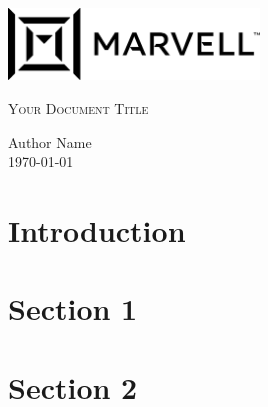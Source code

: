 \documentclass{article}
\begin{document}
\begin{titlepage}
    \centering
    \includegraphics[width=0.5\textwidth]{marvell.png}\par\vspace{1cm}
    {\scshape\LARGE Your Document Title \par}
    \vfill
    \begin{center}
        \large
        Author Name\\
        \today
    \end{center}
    \vfill
\end{titlepage}

\newpage
\tableofcontents
\newpage

\section{Introduction}
\lipsum[1-4]

\section{Section 1}
\lipsum[5-8]

\section{Section 2}
\lipsum[9-12]
\end{document}
